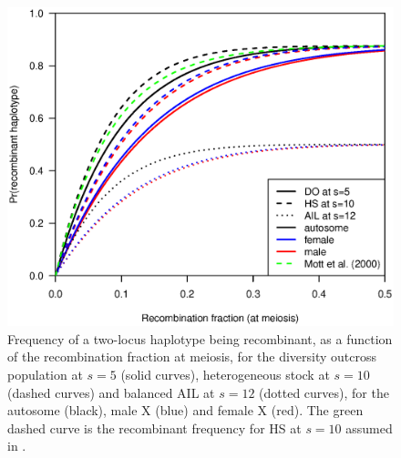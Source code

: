 \documentclass[12pt,letterpaper,pdftex]{article}
\begin{document}
\newpage



\begin{figure}
\centering
\includegraphics[width=\textwidth]{Figs/fig1.eps}

\bigskip
\caption{Frequency of a two-locus haplotype being recombinant, as a
  function of the recombination fraction at meiosis, for the
  diversity outcross population at $s=5$ (solid curves), heterogeneous
  stock at $s=10$ (dashed curves) and balanced AIL at $s=12$ (dotted curves),
  for the autosome (black), male X (blue) and female X (red).  The
  green dashed curve is the recombinant frequency for HS at $s=10$
  assumed in \citet{Mott2000}.\label{fig:one}}
\end{figure}
\end{document}

